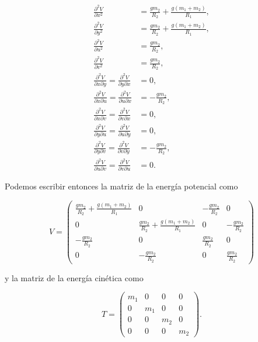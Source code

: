 \documentclass[a4paper,10pt]{article}
\numberwithin{equation}{section}
\begin{document}
\begin{align*}
 \frac{\partial^2 V}{\partial x^2} &= \frac{gm_2}{R_2} + \frac{g(m_1 + m_2)}{R_1}, \\
 \frac{\partial^2 V}{\partial y^2} &= \frac{gm_2}{R_2} + \frac{g(m_1 + m_2)}{R_1}, \\
 \frac{\partial^2 V}{\partial u^2} &= \frac{gm_2}{R_2}, \\
 \frac{\partial^2 V}{\partial v^2} &= \frac{gm_2}{R_2}, \\
 \frac{\partial^2 V}{\partial x\partial y} = \frac{\partial^2 V}{\partial y \partial x}&= 0, \\
 \frac{\partial^2 V}{\partial x \partial u} = \frac{\partial^2 V}{\partial u \partial x}  &= - \frac{gm_2}{R_2}, \\
 \frac{\partial^2 V}{\partial x \partial v} =  \frac{\partial^2 V}{\partial v \partial x} &= 0, \\
 \frac{\partial^2 V}{\partial y \partial u} =  \frac{\partial^2 V}{\partial u \partial y} &= 0, \\
 \frac{\partial^2 V}{\partial y \partial v} =  \frac{\partial^2 V}{\partial v \partial y} &= -\frac{gm_2}{R_2} , \\ 
 \frac{\partial^2 V}{\partial u \partial v} =  \frac{\partial^2 V}{\partial v \partial u} &= 0.
\end{align*}

Podemos escribir entonces la matriz de la energía potencial como

\begin{equation}
 V = \begin{pmatrix}
      \frac{gm_2}{R_2} + \frac{g(m_1 + m_2)}{R_1} & 0 & - \frac{gm_2}{R_2} & 0 \\
      0 & \frac{gm_2}{R_2} + \frac{g(m_1 + m_2)}{R_1} & 0 & - \frac{gm_2}{R_2} \\
      - \frac{gm_2}{R_2} & 0 & \frac{gm_2}{R_2} & 0 \\
      0 & - \frac{gm_2}{R_2} & 0 & \frac{gm_2}{R_2}
     \end{pmatrix}
\end{equation}

y la matriz de la energía cinética como 

\begin{equation}
 T = \begin{pmatrix}
      m_1 & 0 & 0 & 0 \\
      0 & m_1 & 0 & 0 \\
      0 & 0 & m_2 & 0 \\
      0 & 0 & 0 & m_2
     \end{pmatrix}.
\end{equation}
\end{document}
